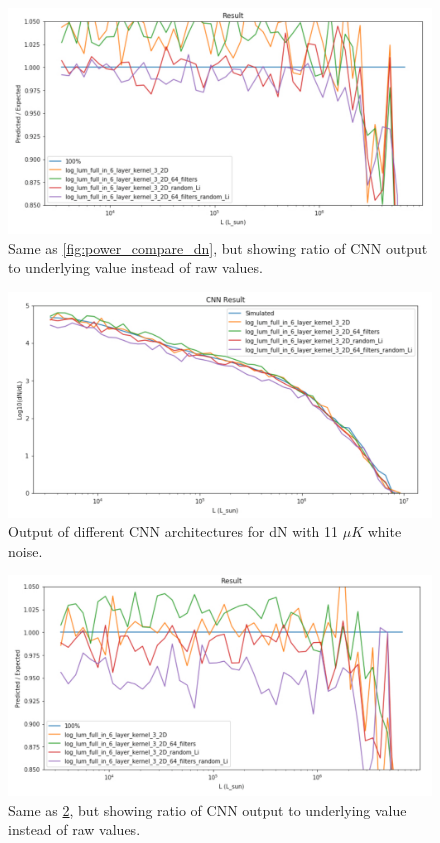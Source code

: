\documentclass{article}
\begin{document}
		\begin{figure}[H]
			\centering
			\includegraphics[width=1.0\textwidth]{power_compare_dn_ratio.pdf}
			\caption{Same as \cref{fig:power_compare_dn}, but showing ratio of CNN output to underlying value instead of raw values.}
			\label{fig:power_compare_dn_ratio}
		\end{figure}

		\begin{figure}[H]
			\centering
			\includegraphics[width=1.0\textwidth]{power_compare_noise_dn.pdf}
			\caption{Output of different CNN architectures for dN with 11 \(\mu K\) white noise.}
			\label{fig:power_compare_noise_dn}
		\end{figure}

		\begin{figure}[H]
			\centering
			\includegraphics[width=1.0\textwidth]{power_compare_noise_dn_ratio.pdf}
			\caption{Same as \cref{fig:power_compare_noise_dn}, but showing ratio of CNN output to underlying value instead of raw values.}
			\label{fig:power_compare_noise_dn_ratio}
		\end{figure}
\end{document}
